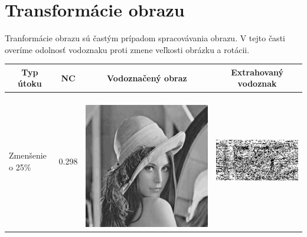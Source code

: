 \section{Transformácie obrazu} \label{transform}
Tranformácie obrazu sú častým prípadom spracovávania obrazu. V tejto časti overíme odolnosť vodoznaku proti zmene veľkosti obrázku a rotácii.
\begin{table}[h]
\centering
\label{transform-table}
\begin{tabular}{llcc}
\hline
\multicolumn{1}{c}{\textbf{Typ útoku}} & \multicolumn{1}{c}{\textbf{NC}} & \multicolumn{1}{c}{\textbf{Vodoznačený obraz}} & \multicolumn{1}{c}{\textbf{Extrahovaný vodoznak}} \\ \hline
Zmenšenie o 25\%                       & 0.298 & 
\begin{minipage}[c]{.1\textwidth}
\ 
  \includegraphics[scale=0.1]{obrazky/scale75}
\end{minipage}
 &
 \begin{minipage}[c]{.15\textwidth}
   \includegraphics[scale=0.25]{obrazky/scale75-wm}

\end{minipage}
\end{tabular}
\end{table}
